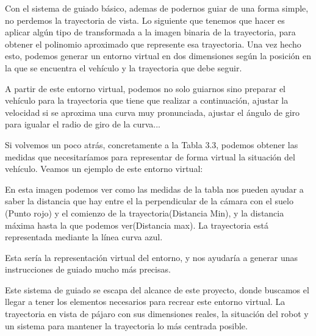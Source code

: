 Con el sistema de guiado básico, ademas de podernos guiar de una forma simple, no perdemos la trayectoria de vista. Lo siguiente que tenemos que hacer es aplicar algún tipo de transformada a la imagen binaria de la trayectoria, para obtener el polinomio aproximado que represente esa trayectoria. Una vez hecho esto, podemos generar un entorno virtual en dos dimensiones según la posición en la que se encuentra el vehículo y la trayectoria que debe seguir.

A partir de este entorno virtual, podemos no solo guiarnos sino preparar el vehículo para la trayectoria que tiene que realizar a continuación, ajustar la velocidad si se aproxima una curva muy pronunciada, ajustar el ángulo de giro para igualar el radio de giro de la curva...

Si volvemos un poco atrás, concretamente a la Tabla 3.3, podemos obtener las medidas que necesitaríamos para representar de forma virtual la situación del vehículo. Veamos un ejemplo de este entorno virtual:


En esta imagen podemos ver como las medidas de la tabla nos pueden ayudar a saber la distancia que hay entre el la perpendicular de la cámara con el suelo (Punto rojo) y el comienzo de la trayectoria(Distancia Min), y la distancia máxima hasta la que podemos ver(Distancia max). La trayectoria está representada mediante la línea curva azul.

Esta sería la representación virtual del entorno, y nos ayudaría a generar unas instrucciones de guiado mucho más precisas. 

Este sistema de guiado se escapa del alcance de este proyecto, donde buscamos el llegar a tener los elementos necesarios para recrear este entorno virtual. La trayectoria en vista de pájaro con sus dimensiones reales, la situación del robot y un sistema para mantener la trayectoria lo más centrada posible.
